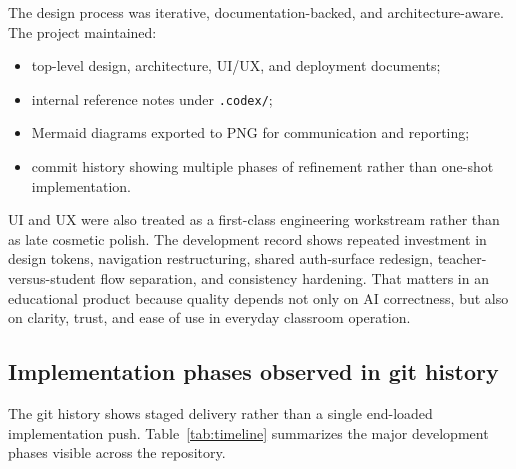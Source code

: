 \documentclass[11pt,a4paper]{article}
\begin{document}
The design process was iterative, documentation-backed, and architecture-aware. The project
maintained:
\begin{itemize}
  \item top-level design, architecture, UI/UX, and deployment documents;
  \item internal reference notes under \texttt{.codex/};
  \item Mermaid diagrams exported to PNG for communication and reporting;
  \item commit history showing multiple phases of refinement rather than one-shot implementation.
\end{itemize}

UI and UX were also treated as a first-class engineering workstream rather than as late cosmetic
polish. The development record shows repeated investment in design tokens, navigation restructuring,
shared auth-surface redesign, teacher-versus-student flow separation, and consistency hardening.
That matters in an educational product because quality depends not only on AI correctness, but also
on clarity, trust, and ease of use in everyday classroom operation.

\subsection{Implementation phases observed in git history}

The git history shows staged delivery rather than a single end-loaded implementation push.
Table~\ref{tab:timeline} summarizes the major development phases visible across the repository.
\end{document}
